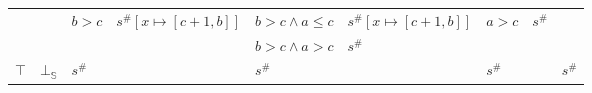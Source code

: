 \documentclass{beamer}
\begin{document}
\begin{frame}
\begin{table}[]
{\begin{tabular}{|l|l|ll|ll|ll|l|}
                                        &                         & \multirow{2}{*}{$b > c$} & \multirow{2}{*}{$s^\#[x \mapsto [c + 1, b]]$} & $b > c \land a \le c$ & $s^\#[x \mapsto [c + 1, b]]$ & \multirow{2}{*}{$a > c$} & \multirow{2}{*}{$s^\#$}        &                                                 \\
                                        &                         &                          &                                               & $b > c \land a > c$   & $s^\#$                   &                          &                                &                                                 \\ \hline
        $\top$                          & $\bot_\mathbb{S}$                  & \multicolumn{2}{l|}{$s^\#$}                                              & \multicolumn{2}{l|}{$s^\#$}                      & \multicolumn{2}{l|}{$s^\#$}                               & $s^\#$                                          \\ \hline
        \end{tabular}}
        \end{table}
    \end{frame}
    
\end{document}
